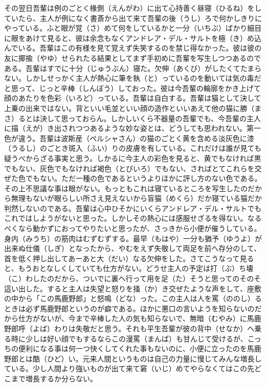 \documentclass{book}
\begin{document}
その翌日吾輩は例のごとく椽側（えんがわ）に出て心持善く昼寝（ひるね）をしていたら、主人が例になく書斎から出て来て吾輩の後（うし）ろで何かしきりにやっている。ふと眼が覚（さ）めて何をしているかと一分（いちぶ）ばかり細目に眼をあけて見ると、彼は余念もなくアンドレア・デル・サルトを極（き）め込んでいる。吾輩はこの有様を見て覚えず失笑するのを禁じ得なかった。彼は彼の友に揶揄（やゆ）せられたる結果としてまず手初めに吾輩を写生しつつあるのである。吾輩はすでに十分（じゅうぶん）寝た。欠伸（あくび）がしたくてたまらない。しかしせっかく主人が熱心に筆を執（と）っているのを動いては気の毒だと思って、じっと辛棒（しんぼう）しておった。彼は今吾輩の輪廓をかき上げて顔のあたりを色彩（いろど）っている。吾輩は自白する。吾輩は猫として決して上乗の出来ではない。背といい毛並といい顔の造作といいあえて他の猫に勝（まさ）るとは決して思っておらん。しかしいくら不器量の吾輩でも、今吾輩の主人に描（えが）き出されつつあるような妙な姿とは、どうしても思われない。第一色が違う。吾輩は波斯産（ペルシャさん）の猫のごとく黄を含める淡灰色に漆（うるし）のごとき斑入（ふい）りの皮膚を有している。これだけは誰が見ても疑うべからざる事実と思う。しかるに今主人の彩色を見ると、黄でもなければ黒でもない、灰色でもなければ褐色（とびいろ）でもない、さればとてこれらを交ぜた色でもない。ただ一種の色であるというよりほかに評し方のない色である。その上不思議な事は眼がない。もっともこれは寝ているところを写生したのだから無理もないが眼らしい所さえ見えないから盲猫（めくら）だか寝ている猫だか判然しないのである。吾輩は心中ひそかにいくらアンドレア・デル・サルトでもこれではしようがないと思った。しかしその熱心には感服せざるを得ない。なるべくなら動かずにおってやりたいと思ったが、さっきから小便が催うしている。身内（みうち）の筋肉はむずむずする。最早（もはや）一分も猶予（ゆうよ）が出来ぬ仕儀（しぎ）となったから、やむをえず失敬して両足を前へ存分のして、首を低く押し出してあーあと大（だい）なる欠伸をした。さてこうなって見ると、もうおとなしくしていても仕方がない。どうせ主人の予定は打（ぶ）ち壊（こ）わしたのだから、ついでに裏へ行って用を足（た）そうと思ってのそのそ這い出した。すると主人は失望と怒りを掻（か）き交ぜたような声をして、座敷の中から「この馬鹿野郎」と怒鳴（どな）った。この主人は人を罵（ののし）るときは必ず馬鹿野郎というのが癖である。ほかに悪口の言いようを知らないのだから仕方がないが、今まで辛棒した人の気も知らないで、無暗（むやみ）に馬鹿野郎呼（よば）わりは失敬だと思う。それも平生吾輩が彼の背中（せなか）へ乗る時に少しは好い顔でもするならこの漫罵（まんば）も甘んじて受けるが、こっちの便利になる事は何一つ快くしてくれた事もないのに、小便に立ったのを馬鹿野郎とは酷（ひど）い。元来人間というものは自己の力量に慢じてみんな増長している。少し人間より強いものが出て来て窘（いじ）めてやらなくてはこの先どこまで増長するか分らない。\\
\end{document}
